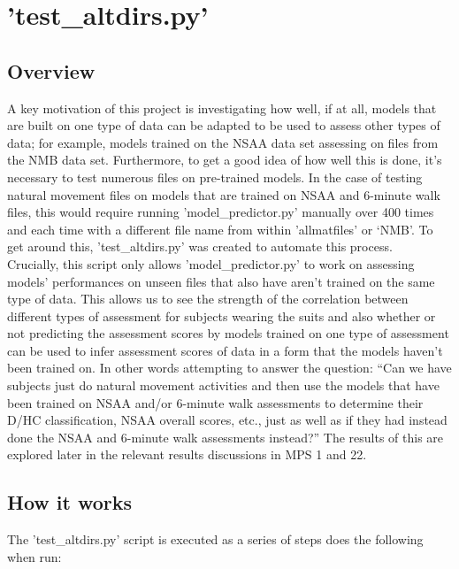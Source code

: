 \documentclass[12pt,twoside]{report}
\begin{document}
\section{'test\_altdirs.py'}

\subsection{Overview}

\quad A key motivation of this project is investigating how well, if at all, models that are built on one type of data can be adapted to be used to assess other types of data; for example, models trained on the NSAA data set assessing on files from the NMB data set. Furthermore, to get a good idea of how well this is done, it's necessary to test numerous files on pre-trained models. In the case of testing natural movement files on models that are trained on NSAA and 6-minute walk files, this would require running 'model\_predictor.py' manually over 400 times and each time with a different file name from within 'allmatfiles' or ‘NMB’. To get around this, 'test\_altdirs.py' was created to automate this process.\\

\quad Crucially, this script only allows 'model\_predictor.py' to work on assessing models' performances on unseen files that also have aren't trained on the same type of data. This allows us to see the strength of the correlation between different types of assessment for subjects wearing the suits and also whether or not predicting the assessment scores by models trained on one type of assessment can be used to infer assessment scores of data in a form that the models haven't been trained on. In other words attempting to answer the question: “Can we have subjects just do natural movement activities and then use the models that have been trained on NSAA and/or 6-minute walk assessments to determine their D/HC classification, NSAA overall scores, etc., just as well as if they had instead done the NSAA and 6-minute walk assessments instead?” The results of this are explored later in the relevant results discussions in MPS 1 and 22.


\subsection{How it works}

\quad The 'test\_altdirs.py' script is executed as a series of steps does the following when run:
\end{document}
